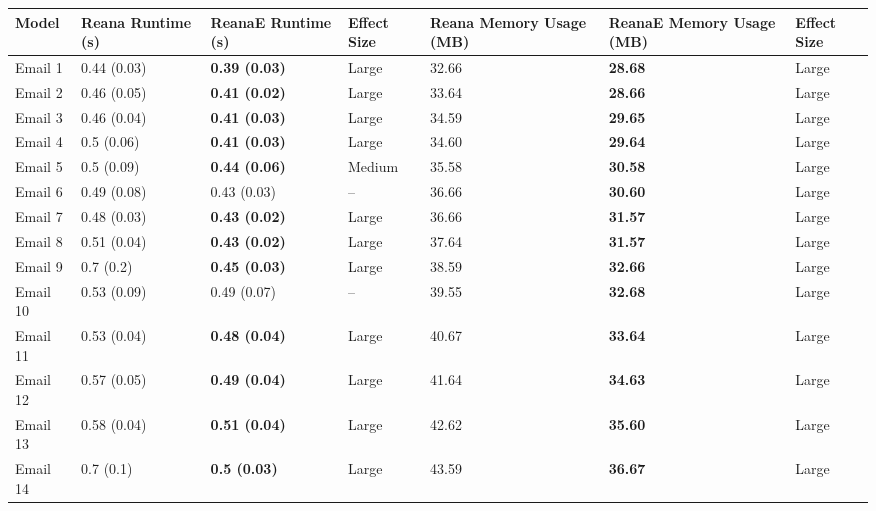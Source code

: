 \begin{tabular}{lllllll}
\toprule
    Model & Reana Runtime (s) &    ReanaE Runtime (s) & Effect Size & Reana Memory Usage (MB) & ReanaE Memory Usage (MB) & Effect Size \\
\midrule
  Email 1 &       0.44 (0.03) &  \textbf{0.39 (0.03)} &       Large &                   32.66 &           \textbf{28.68} &       Large \\
  Email 2 &       0.46 (0.05) &  \textbf{0.41 (0.02)} &       Large &                   33.64 &           \textbf{28.66} &       Large \\
  Email 3 &       0.46 (0.04) &  \textbf{0.41 (0.03)} &       Large &                   34.59 &           \textbf{29.65} &       Large \\
  Email 4 &        0.5 (0.06) &  \textbf{0.41 (0.03)} &       Large &                   34.60 &           \textbf{29.64} &       Large \\
  Email 5 &        0.5 (0.09) &  \textbf{0.44 (0.06)} &      Medium &                   35.58 &           \textbf{30.58} &       Large \\
  Email 6 &       0.49 (0.08) &           0.43 (0.03) &          -- &                   36.66 &           \textbf{30.60} &       Large \\
  Email 7 &       0.48 (0.03) &  \textbf{0.43 (0.02)} &       Large &                   36.66 &           \textbf{31.57} &       Large \\
  Email 8 &       0.51 (0.04) &  \textbf{0.43 (0.02)} &       Large &                   37.64 &           \textbf{31.57} &       Large \\
  Email 9 &         0.7 (0.2) &  \textbf{0.45 (0.03)} &       Large &                   38.59 &           \textbf{32.66} &       Large \\
 Email 10 &       0.53 (0.09) &           0.49 (0.07) &          -- &                   39.55 &           \textbf{32.68} &       Large \\
 Email 11 &       0.53 (0.04) &  \textbf{0.48 (0.04)} &       Large &                   40.67 &           \textbf{33.64} &       Large \\
 Email 12 &       0.57 (0.05) &  \textbf{0.49 (0.04)} &       Large &                   41.64 &           \textbf{34.63} &       Large \\
 Email 13 &       0.58 (0.04) &  \textbf{0.51 (0.04)} &       Large &                   42.62 &           \textbf{35.60} &       Large \\
 Email 14 &         0.7 (0.1) &   \textbf{0.5 (0.03)} &       Large &                   43.59 &           \textbf{36.67} &       Large \\

\end{tabular}
